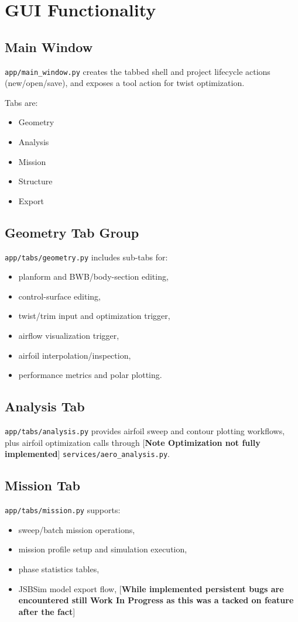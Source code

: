 ﻿\documentclass[11pt]{article}
\begin{document}
\section{GUI Functionality}
\subsection{Main Window}
\texttt{app/main\_window.py} creates the tabbed shell and project lifecycle actions (new/open/save), and exposes a tool action for twist optimization.

Tabs are:
\begin{itemize}
\item Geometry
\item Analysis
\item Mission
\item Structure
\item Export
\end{itemize}

\subsection{Geometry Tab Group}
\texttt{app/tabs/geometry.py} includes sub-tabs for:
\begin{itemize}
\item planform and BWB/body-section editing,
\item control-surface editing,
\item twist/trim input and optimization trigger,
\item airflow visualization trigger,
\item airfoil interpolation/inspection,
\item performance metrics and polar plotting.
\end{itemize}

\subsection{Analysis Tab}
\texttt{app/tabs/analysis.py} provides airfoil sweep and contour plotting workflows, plus airfoil optimization calls through [\textbf{Note Optimization not fully implemented}] \texttt{services/aero\_analysis.py}.

\subsection{Mission Tab}
\texttt{app/tabs/mission.py} supports:
\begin{itemize}
\item sweep/batch mission operations,
\item mission profile setup and simulation execution,
\item phase statistics tables,
\item JSBSim model export flow, [\textbf{While implemented persistent bugs are encountered still Work In Progress as this was a tacked on feature after the fact}]
\end{itemize}
\end{document}
